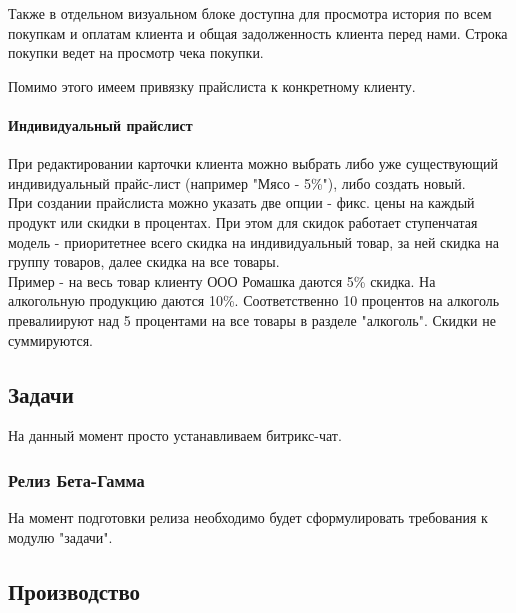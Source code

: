 \documentclass[DIV=calc, paper=a4, fontsize=11pt]{scrartcl} %
\begin{document}
Также в отдельном визуальном блоке доступна для просмотра история по всем покупкам и оплатам клиента и общая задолженность клиента перед нами. Строка покупки ведет на просмотр чека покупки.  

Помимо этого имеем привязку прайслиста к конкретному клиенту.

\paragraph{Индивидуальный прайслист}

При редактировании карточки клиента можно выбрать либо уже существующий индивидуальный прайс-лист (например "Мясо - 5\%"), либо создать новый.
\\[0.5cm]
При создании прайслиста можно указать две опции - фикс. цены на каждый продукт или скидки в процентах. При этом для скидок работает ступенчатая модель - приоритетнее всего скидка на индивидуальный товар, за ней скидка на группу товаров, далее скидка на все товары.
\\[0.5cm]
Пример - на весь товар клиенту ООО Ромашка даются 5\% скидка. На алкогольную продукцию даются 10\%. Соответственно 10 процентов на алкоголь превалиируют над 5 процентами на все товары в разделе "алкоголь". Скидки не суммируются.

\subsection{Задачи}

На данный момент просто устанавливаем битрикс-чат.

\subsubsection{Релиз Бета-Гамма}
На момент подготовки релиза необходимо будет сформулировать требования к модулю "задачи".

\subsection{Производство}
\end{document}
